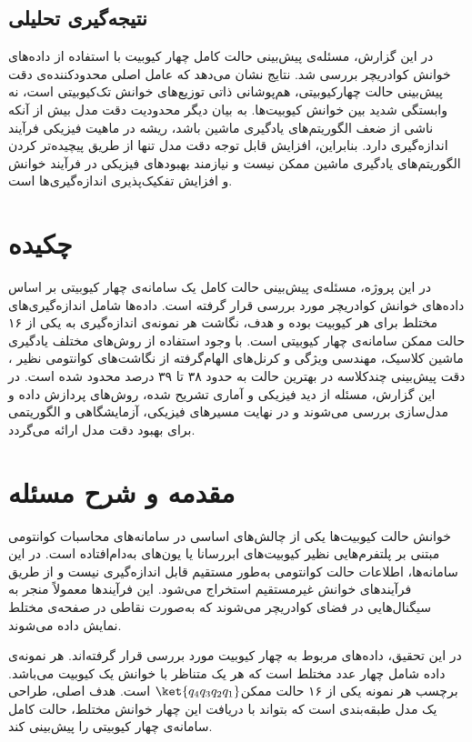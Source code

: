 \subsection*{نتیجه‌گیری تحلیلی}
در این گزارش، مسئله‌ی پیش‌بینی حالت کامل چهار کیوبیت با استفاده از داده‌های خوانش کوادریچر بررسی شد. نتایج نشان می‌دهد که عامل اصلی محدودکننده‌ی دقت پیش‌بینی حالت چهارکیوبیتی، هم‌پوشانی ذاتی توزیع‌های خوانش تک‌کیوبیتی است، نه وابستگی شدید بین خوانش کیوبیت‌ها. به بیان دیگر محدودیت دقت مدل بیش از آنکه ناشی از ضعف الگوریتم‌های یادگیری ماشین باشد، ریشه در ماهیت فیزیکی فرآیند اندازه‌گیری دارد. بنابراین، افزایش قابل توجه دقت مدل تنها از طریق پیچیده‌تر کردن الگوریتم‌های یادگیری ماشین ممکن نیست و نیازمند بهبودهای فیزیکی در فرآیند خوانش و افزایش تفکیک‌پذیری اندازه‌گیری‌ها است.



\section*{چکیده}
در این پروژه، مسئله‌ی پیش‌بینی حالت کامل یک سامانه‌ی چهار کیوبیتی بر اساس داده‌های خوانش کوادریچر مورد بررسی قرار گرفته است. داده‌ها شامل اندازه‌گیری‌های مختلط برای هر کیوبیت بوده و هدف، نگاشت هر نمونه‌ی اندازه‌گیری به یکی از ۱۶ حالت ممکن سامانه‌ی چهار کیوبیتی است. با وجود استفاده از روش‌های مختلف یادگیری ماشین کلاسیک، مهندسی ویژگی و کرنل‌های الهام‌گرفته از نگاشت‌های کوانتومی نظیر ، دقت پیش‌بینی چندکلاسه در بهترین حالت به حدود ۳۸ تا ۳۹ درصد محدود شده است. در این گزارش، مسئله از دید فیزیکی و آماری تشریح شده، روش‌های پردازش داده و مدل‌سازی بررسی می‌شوند و در نهایت مسیرهای فیزیکی، آزمایشگاهی و الگوریتمی برای بهبود دقت مدل ارائه می‌گردد.

\section{مقدمه و شرح مسئله}
خوانش حالت کیوبیت‌ها یکی از چالش‌های اساسی در سامانه‌های محاسبات کوانتومی مبتنی بر پلتفرم‌هایی نظیر کیوبیت‌های ابررسانا یا یون‌های به‌دام‌افتاده است. در این سامانه‌ها، اطلاعات حالت کوانتومی به‌طور مستقیم قابل اندازه‌گیری نیست و از طریق فرآیندهای خوانش غیرمستقیم استخراج می‌شود. این فرآیندها معمولاً منجر به سیگنال‌هایی در فضای کوادریچر می‌شوند که به‌صورت نقاطی در صفحه‌ی مختلط  نمایش داده می‌شوند.

در این تحقیق، داده‌های مربوط به چهار کیوبیت مورد بررسی قرار گرفته‌اند. هر نمونه‌ی داده شامل چهار عدد مختلط است که هر یک متناظر با خوانش یک کیوبیت می‌باشد. برچسب هر نمونه یکی از ۱۶ حالت ممکن$ \ket{q_4 q_3 q_2 q_1}$ است. هدف اصلی، طراحی یک مدل طبقه‌بندی است که بتواند با دریافت این چهار خوانش مختلط، حالت کامل سامانه‌ی چهار کیوبیتی را پیش‌بینی کند.


